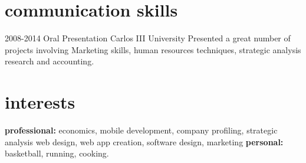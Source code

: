 \documentclass[]{friggeri-cv} %
\begin{document}

\section{communication skills}

\begin{entrylist}
\entry
{2008-2014}
{Oral Presentation}
{Carlos III University}
{Presented a great number of projects involving Marketing skills, human resources techniques, strategic analysis research and accounting.}
\end{entrylist}


\section{interests}

\textbf{professional:} economics, mobile development, company profiling, strategic analysis web design, web app creation, software design, marketing \textbf{personal:} basketball, running, cooking.

\end{document}
